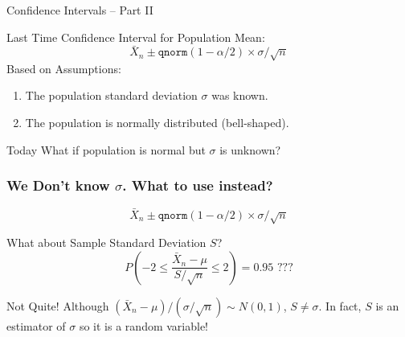\documentclass[handout]{beamer}
\date{Lecture 16}
\begin{document}
 





\begin{frame}[plain]
	\titlepage 
	

\end{frame} 



\begin{frame}

\centering \Huge Confidence Intervals -- Part II

\end{frame}



\begin{frame}
\begin{block}{Last Time}
Confidence Interval for Population Mean:
$$\boxed{\bar{X}_n \pm \texttt{qnorm}(1-\alpha/2) \times \sigma/\sqrt{n}}$$
Based on Assumptions:
	\begin{enumerate}
\item The population standard deviation $\sigma$ was known.
\item The population is normally distributed (bell-shaped).
\end{enumerate}
\end{block}
\begin{block}{Today}
What if population is normal but $\sigma$ is unknown?
\end{block}

\end{frame}
\begin{frame}
\frametitle{We Don't know $\sigma$. What to use instead?}
$$\boxed{\bar{X}_n \pm \texttt{qnorm}(1-\alpha/2) \times \sigma/\sqrt{n}}$$

\begin{block}{What about Sample Standard Deviation $S$?}
	$$P\left(-2 \leq \frac{\bar{X}_n-\mu}{S/\sqrt{n}} \leq 2 \right) = 0.95 \mbox{ ???}$$
\end{block}

\begin{block}{Not Quite!}
Although $(\bar{X}_n-\mu)/(\sigma/\sqrt{n})\sim N(0,1)$, $S \neq \sigma$. In fact, $S$ is an \alert{estimator} of $\sigma$ so it is a \alert{random variable!}
\end{block}
\end{frame}
\end{document}
